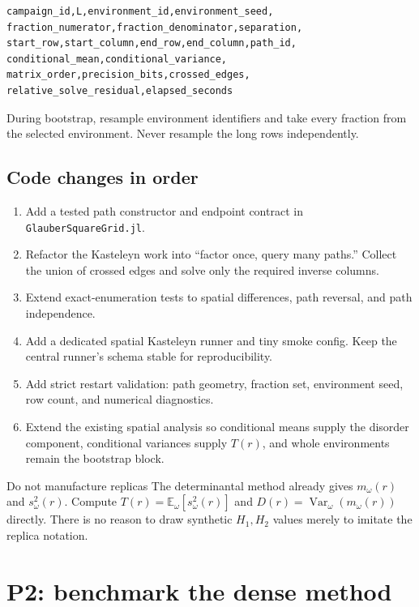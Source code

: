 \documentclass[11pt,a4paper,oneside,openany]{memoir}
\newcommand{\E}{\mathbb{E}}
\newcommand{\Var}{\operatorname{Var}}
\newcommand{\code}[1]{\texttt{#1}}
\newcommand{\1}{\bm{1}}
\begin{document}
\begin{lstlisting}[language={}]
campaign_id,L,environment_id,environment_seed,
fraction_numerator,fraction_denominator,separation,
start_row,start_column,end_row,end_column,path_id,
conditional_mean,conditional_variance,
matrix_order,precision_bits,crossed_edges,
relative_solve_residual,elapsed_seconds
\end{lstlisting}

During bootstrap, resample environment identifiers and take every fraction
from the selected environment. Never resample the long rows independently.

\subsection{Code changes in order}

\begin{enumerate}
  \item Add a tested path constructor and endpoint contract in
  \code{GlauberSquareGrid.jl}.
  \item Refactor the Kasteleyn work into ``factor once, query many paths.''
  Collect the union of crossed edges and solve only the required inverse columns.
  \item Extend exact-enumeration tests to spatial differences, path reversal,
  and path independence.
  \item Add a dedicated spatial Kasteleyn runner and tiny smoke config. Keep
  the central runner's schema stable for reproducibility.
  \item Add strict restart validation: path geometry, fraction set, environment
  seed, row count, and numerical diagnostics.
  \item Extend the existing spatial analysis so conditional means supply the
  disorder component, conditional variances supply $T(r)$, and whole
  environments remain the bootstrap block.
\end{enumerate}

\begin{warningbox}{Do not manufacture replicas}
The determinantal method already gives $m_\omega(r)$ and $s^2_\omega(r)$.
Compute
$T(r)=\E_\omega[s^2_\omega(r)]$ and
$D(r)=\Var_\omega(m_\omega(r))$ directly. There is no reason to draw synthetic
$H_1,H_2$ values merely to imitate the replica notation.
\end{warningbox}

\section{P2: benchmark the dense method}
\end{document}
